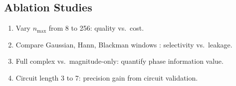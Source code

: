 \documentclass[11pt,twocolumn,a4paper]{article}
\begin{document}
\subsection{Ablation Studies}

\begin{enumerate}[nosep]
  \item Vary $n_{\max}$ from 8 to 256: quality vs.\ cost.
  \item Compare Gaussian, Hann, Blackman windows \citep{harris1978}:
    selectivity vs.\ leakage.
  \item Full complex vs.\ magnitude-only: quantify phase information
    value.
  \item Circuit length 3 to 7: precision gain from circuit validation.
\end{enumerate}

\end{document}
